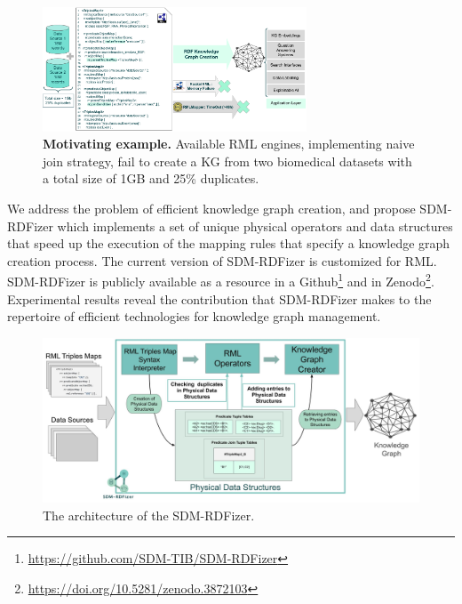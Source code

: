 \begin{figure}[t!]
\centering
\includegraphics[width=0.7\textwidth]{figures/Motivating_Example_v1.1.pdf}
\caption[SDM-RDFizer motivating example]{\textbf{Motivating example.} Available RML engines, implementing naive join strategy, fail to create a KG from two biomedical datasets with a total size of 1GB and 25\% duplicates.} 
\label{fig:motivatingExample}
\end{figure}

We address the problem of efficient knowledge graph creation, and propose SDM-RDFizer which implements a set of unique physical operators and data structures that speed up the execution of the mapping rules that specify a knowledge graph creation process. The current version of SDM-RDFizer is customized for RML. SDM-RDFizer is publicly available as a resource in a Github\footnote{\url{https://github.com/SDM-TIB/SDM-RDFizer}} and in Zenodo\footnote{\url{https://doi.org/10.5281/zenodo.3872103}}. Experimental results reveal the contribution that SDM-RDFizer makes to the repertoire of efficient technologies for knowledge graph management.  
\begin{figure}[!th]
    \centering
    \includegraphics[width=1\textwidth]{figures/architecture_v1.1.jpg}
    \caption[SDM-RDFizer architecture]{The architecture of the SDM-RDFizer.}
    \label{fig:architecture}

\end{figure}



